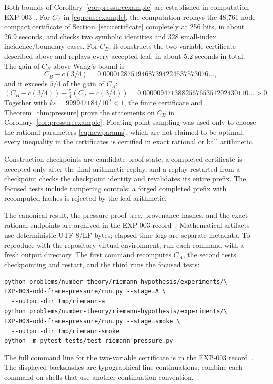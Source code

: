 \documentclass[11pt]{article}
\theoremstyle{remark}
\begin{document}
Both bounds of Corollary~\ref{cor:pressureexample} are established in
computation EXP-003~\cite{RecordIII}. For $C_A$ in \eqref{eq:reuseexample},
the computation replays the 48,761-node compact certificate of
Section~\ref{sec:certificate} completely at 256 bits, in about 26.9
seconds, and checks two symbolic identities and 328 small-index
incidence\slash boundary cases. For $C_B$, it constructs the two-variable
certificate described above and replays every accepted leaf, in about 5.2
seconds in total. The gain of $C_B$ above Wang's bound is
\[
 C_B-c(3/4)=0.000012875194687394224537573076\ldots,
\]
and it exceeds $5/4$ of the gain of $C_A$:
\[
 (C_B-c(3/4))-\tfrac54(C_A-c(3/4))
 =0.000009471388256765351202430110\ldots>0.
\]
Together with $k\varepsilon=999947184/10^9<1$, the finite certificate and
Theorem~\ref{thm:pressure} prove the statements on $C_B$ in
Corollary~\ref{cor:pressureexample}. Floating-point sampling was used only
to choose the rational parameters \eqref{eq:newparams}, which are not
claimed to be optimal; every inequality in the certificates is certified in
exact rational or ball arithmetic.

Construction checkpoints are candidate proof state; a completed
certificate is accepted only after the final arithmetic replay, and a
replay restarted from a checkpoint checks the checkpoint identity and
revalidates its entire prefix. The focused tests include tampering
controls: a forged completed prefix with recomputed hashes is rejected by
the leaf arithmetic.

The canonical result, the pressure proof tree, provenance hashes, and the
exact rational endpoints are archived in the EXP-003
record~\cite{RecordIII}. Mathematical artifacts use deterministic UTF-8/LF
bytes; elapsed-time logs are separate metadata. To reproduce with the
repository virtual environment, run each command with a fresh output
directory. The first command recomputes $C_A$, the second tests
checkpointing and restart, and the third runs the focused tests:
\begin{verbatim}
python problems/number-theory/riemann-hypothesis/experiments/\
EXP-003-odd-frame-pressure/run.py --stage=A \
  --output-dir tmp/riemann-a
python problems/number-theory/riemann-hypothesis/experiments/\
EXP-003-odd-frame-pressure/run.py --stage=smoke \
  --output-dir tmp/riemann-smoke
python -m pytest tests/test_riemann_pressure.py
\end{verbatim}
The full command line for the two-variable certificate is in the EXP-003
record~\cite{RecordIII}. The displayed backslashes are typographical line
continuations; combine each command on shells that use another
continuation convention.
\end{document}
